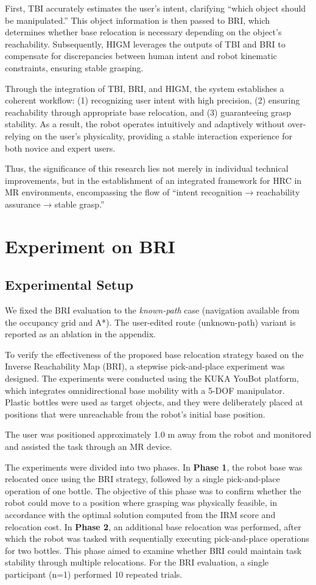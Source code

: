 \documentclass[../../main.tex]{subfiles} %
\begin{document}
First, TBI accurately estimates the user’s intent, clarifying “which object should be manipulated.”  
This object information is then passed to BRI, which determines whether base relocation is necessary 
depending on the object’s reachability.  
Subsequently, HIGM leverages the outputs of TBI and BRI to compensate for discrepancies between human 
intent and robot kinematic constraints, ensuring stable grasping.

Through the integration of TBI, BRI, and HIGM, the system establishes a coherent workflow:  
(1) recognizing user intent with high precision,  
(2) ensuring reachability through appropriate base relocation, and  
(3) guaranteeing grasp stability.  
As a result, the robot operates intuitively and adaptively without over-relying on the user’s physicality, 
providing a stable interaction experience for both novice and expert users.

Thus, the significance of this research lies not merely in individual technical improvements, but in the establishment 
of an integrated framework for HRC in MR environments, encompassing the flow of 
“intent recognition → reachability assurance → stable grasp.”

\section{Experiment on BRI}
\subsection{Experimental Setup}


We fixed the BRI evaluation to the \emph{known-path} case (navigation available from
the occupancy grid and A*). The user-edited route (unknown-path) variant is reported
as an ablation in the appendix.

To verify the effectiveness of the proposed base relocation strategy 
based on the Inverse Reachability Map (BRI), 
a stepwise pick-and-place experiment was designed. 
The experiments were conducted using the KUKA YouBot platform, 
which integrates omnidirectional base mobility with a 5-DOF manipulator. 
Plastic bottles were used as target objects, and they were 
deliberately placed at positions that were unreachable from the 
robot’s initial base position.

The user was positioned approximately 1.0 m away from the robot 
and monitored and assisted the task through an MR device.

The experiments were divided into two phases. 
In \textbf{Phase 1}, the robot base was relocated once using the BRI strategy, 
followed by a single pick-and-place operation of one bottle. 
The objective of this phase was to confirm whether the robot could move to a position 
where grasping was physically feasible, in accordance with the 
optimal solution computed from the IRM score and relocation cost. 
In \textbf{Phase 2}, an additional base relocation was performed, 
after which the robot was tasked with sequentially executing 
pick-and-place operations for two bottles. 
This phase aimed to examine whether BRI could maintain task stability 
through multiple relocations. 
For the BRI evaluation, a single participant (n=1) performed 10 repeated trials.
\end{document}
